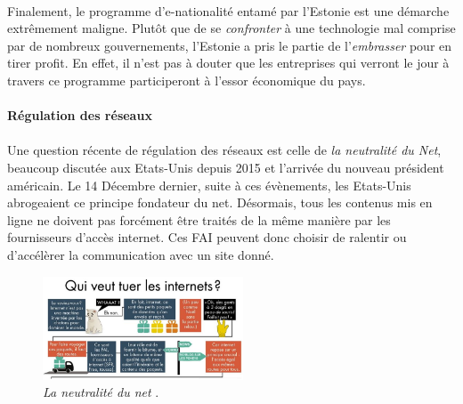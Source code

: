 \paragraph{} Finalement, le programme d'e-nationalité entamé par l'Estonie est une démarche extrêmement maligne. Plutôt
que de se \emph{confronter} à une technologie mal comprise par de nombreux gouvernements, l'Estonie a pris le partie de
l'\emph{embrasser} pour en tirer profit. En effet, il n'est pas à douter que les entreprises qui verront le jour à travers
ce programme participeront à l'essor économique du pays.

\paragraph{Régulation des réseaux}

\paragraph{} Une question récente de régulation des réseaux est celle de \emph{la neutralité du Net},
beaucoup discutée aux Etats-Unis depuis 2015 et l'arrivée du nouveau président américain. Le 14 Décembre
dernier, suite à ces évènements, les Etats-Unis abrogeaient ce principe fondateur du net. \cite{NetNeutrality0}
Désormais, tous les contenus mis en ligne ne doivent pas forcément être traités de la même manière par
les fournisseurs d'accès internet. Ces FAI peuvent donc choisir de ralentir ou d'accélèrer la communication
avec un site donné.

\begin{figure}[ht]
    \centering
    \includegraphics[width=225px]{chapters/02/images/internet_cats.jpg}
    \caption{\label{netneutrality}\emph{La neutralité du net} \cite{NetNeutrality1}.}
\end{figure}

